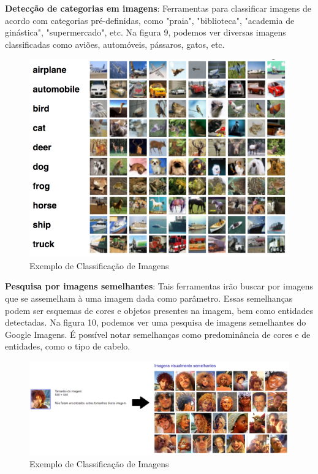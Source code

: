 \documentclass{article}
\begin{document}
\textbf{Detecção de categorias em imagens}: Ferramentas para classificar imagens de acordo com categorias pré-definidas, como "praia", "biblioteca", "academia de ginástica", "supermercado", etc. Na figura 9, podemos ver diversas imagens classificadas como aviões, automóveis, pássaros, gatos, etc.\\
\begin{figure}[H]
    \centering
    \includegraphics[scale=0.3]{imagens/classificacao_imagens.png}
    \caption{Exemplo de Classificação de Imagens}
    \label{fig:classificação_imagens}
\end{figure}{}
\textbf{Pesquisa por imagens semelhantes}: Tais ferramentas irão buscar por imagens que se assemelham à uma imagem dada como parâmetro. Essas semelhanças podem ser esquemas de cores e objetos presentes na imagem, bem como entidades detectadas. Na figura 10, podemos ver uma pesquisa de imagens semelhantes do Google Imagens. É possível notar semelhanças como predominância de cores e de entidades, como o tipo de cabelo.\\
\begin{figure}[H]
    \centering
    \includegraphics[scale=0.4]{imagens/imagens_semelhantes.png}
    \caption{Exemplo de Classificação de Imagens}
    \label{fig:imagens_semelhantes}
\end{figure}{}
\end{document}
